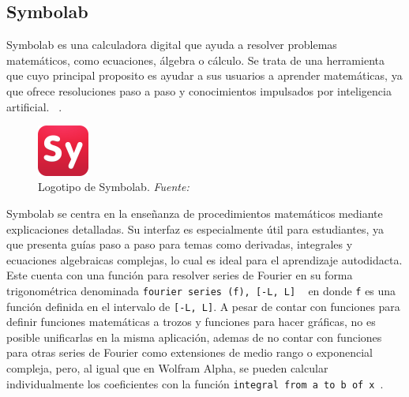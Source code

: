 \subsection{Symbolab}
Symbolab es una calculadora digital que ayuda a resolver problemas matemáticos, como ecuaciones, álgebra o cálculo. Se trata de una herramienta que cuyo principal proposito es ayudar a sus usuarios a aprender matemáticas, ya que ofrece resoluciones paso a paso y conocimientos impulsados por inteligencia artificial. ~\cite{symbolabDocs}. 
\begin{figure}[H]
	\centering
	\includegraphics[width=0.15\textwidth]{img/chapter02/logo_symbolab.png}
	\caption[Logotipo de Symbolab.]{Logotipo de Symbolab. \textit{Fuente: ~\cite{symbolabDocs}}}
	\label{fig:logo-symbolab}  %
\end{figure}
Symbolab se centra en la enseñanza de procedimientos matemáticos mediante explicaciones detalladas. Su interfaz es especialmente útil para estudiantes, ya que presenta guías paso a paso para temas como derivadas, integrales y ecuaciones algebraicas complejas, lo cual es ideal para el aprendizaje autodidacta. Este cuenta con una función para resolver series de Fourier en su forma trigonométrica denominada \texttt{fourier series (f), [-L, L]} ~\cite{symbolabDocs} en donde \texttt{f} es una función definida en el intervalo de \texttt{[-L, L]}. A pesar de contar con funciones para definir funciones matemáticas a trozos y funciones para hacer gráficas, no es posible unificarlas en la misma aplicación, ademas de no contar con funciones para otras series de Fourier como extensiones de medio rango o exponencial compleja, pero, al igual que en Wolfram Alpha, se pueden calcular individualmente los coeficientes con la función \texttt{integral from a to b of x}~\cite{symbolabDocs}.

